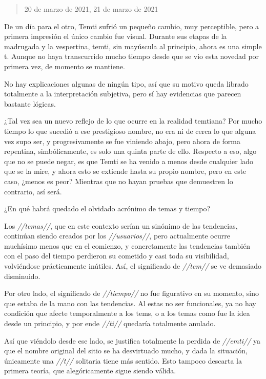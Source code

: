 \documentclass[
  spanish,
]{book}
\begin{document}
\begin{quote}
20 de marzo de 2021, 21 de marzo de 2021
\end{quote}

De un día para el otro, Temti sufrió un pequeño cambio, muy perceptible, pero a primera impresión el único cambio fue visual. Durante sus etapas de la madrugada y la vespertina, temti, sin mayúscula al principio, ahora es una simple t. Aunque no haya transcurrido mucho tiempo desde que se vio esta novedad por primera vez, de momento se mantiene.

No hay explicaciones algunas de ningún tipo, así que su motivo queda librado totalmente a la interpretación subjetiva, pero sí hay evidencias que parecen bastante lógicas.

¿Tal vez sea un nuevo reflejo de lo que ocurre en la realidad temtiana? Por mucho tiempo lo que sucedió a ese prestigioso nombre, no era ni de cerca lo que alguna vez supo ser, y progresivamente se fue viniendo abajo, pero ahora de forma repentina, simbólicamente, es solo una quinta parte de ello. Respecto a eso, algo que no se puede negar, es que Temti se ha venido a menos desde cualquier lado que se la mire, y ahora esto se extiende hasta su propio nombre, pero en este caso, ¿menos es peor? Mientras que no hayan pruebas que demuestren lo contrario, así será.

¿En qué habrá quedado el olvidado acrónimo de temas y tiempo?

Los \emph{//temas//}, que en este contexto serían un sinónimo de las tendencias, continúan siendo creados por los \emph{//usuarios//}, pero actualmente ocurre muchísimo menos que en el comienzo, y concretamente las tendencias también con el paso del tiempo perdieron su cometido y casi toda su visibilidad, volviéndose prácticamente inútiles. Así, el significado de \emph{//tem//} se ve demasiado disminuido.

Por otro lado, el significado de \emph{//tiempo//} no fue figurativo en su momento, sino que estaba de la mano con las tendencias. Al estas no ser funcionales, ya no hay condición que afecte temporalmente a los tems, o a los temas como fue la idea desde un principio, y por ende \emph{//ti//} quedaría totalmente anulado.

Así que viéndolo desde ese lado, se justifica totalmente la perdida de \emph{//emti//} ya que el nombre original del sitio se ha desvirtuado mucho, y dada la situación, únicamente una \emph{//t//} solitaria tiene más sentido. Esto tampoco descarta la primera teoría, que alegóricamente sigue siendo válida.
\end{document}
